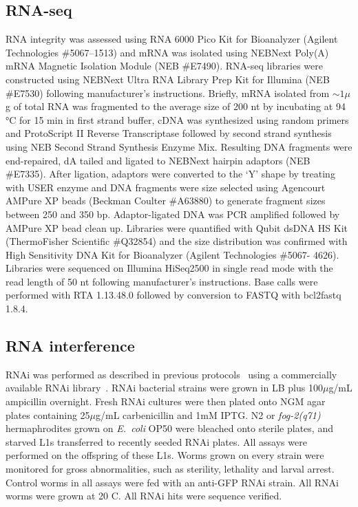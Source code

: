 \documentclass[9pt,twocolumn,twoside]{gsag3jnl}
\newcommand{\fog}{\emph{fog-2}}
\newcommand{\ecol}{\emph{E.~coli}}
\begin{document}
\subsection{RNA-seq}
\label{sb:rna_seq}

RNA integrity was assessed using RNA 6000 Pico Kit for Bioanalyzer (Agilent Technologies \#5067--1513) and mRNA was isolated using NEBNext Poly(A) mRNA Magnetic Isolation Module (NEB \#E7490). RNA-seq libraries were constructed using NEBNext Ultra RNA Library Prep Kit for Illumina (NEB \#E7530) following manufacturer’s instructions. Briefly, mRNA isolated from $\sim1\mu$g of total RNA was fragmented to the average size of 200 nt by incubating at 94 °C for 15 min in first strand buffer, cDNA was synthesized using random primers and ProtoScript II Reverse Transcriptase followed by second strand synthesis using NEB Second Strand Synthesis Enzyme Mix. Resulting DNA fragments were end-repaired, dA tailed and ligated to NEBNext hairpin adaptors (NEB \#E7335).
After ligation, adaptors were converted to the ‘Y’ shape by treating with USER enzyme and DNA fragments were size selected using Agencourt AMPure XP beads (Beckman Coulter \#A63880) to generate fragment sizes between 250 and 350 bp. Adaptor-ligated DNA was PCR amplified followed by AMPure XP bead clean up. Libraries were quantified with Qubit dsDNA HS Kit (ThermoFisher Scientific \#Q32854) and the size distribution was confirmed with High Sensitivity DNA Kit for Bioanalyzer (Agilent Technologies \#5067- 4626).
Libraries were sequenced on Illumina HiSeq2500 in single read mode with the read length of 50 nt following manufacturer's instructions. Base calls were performed with RTA 1.13.48.0 followed by conversion to FASTQ with bcl2fastq 1.8.4.

\subsection{RNA interference}
\label{sb:rnai}
RNAi was performed as described in previous protocols~\citep{Kamath2001} using a commercially available RNAi library~\citep{Kamath2003}. RNAi bacterial strains were grown in LB plus 100$\mu$g/mL ampicillin overnight. Fresh RNAi cultures were then plated onto NGM agar plates containing 25$\mu$g/mL carbenicillin and 1mM IPTG\@. N2 or \fog{}\emph{(q71)} hermaphrodites grown on \ecol{} OP50 were bleached onto sterile plates, and starved L1s transferred to recently seeded RNAi plates.
All assays were performed on the offspring of these L1s. Worms grown on every strain were monitored for gross abnormalities, such as sterility, lethality and larval arrest. Control worms in all assays were fed with an anti-GFP RNAi strain. All RNAi worms were grown at 20\degree{} C. All RNAi hits were sequence verified.
\end{document}

